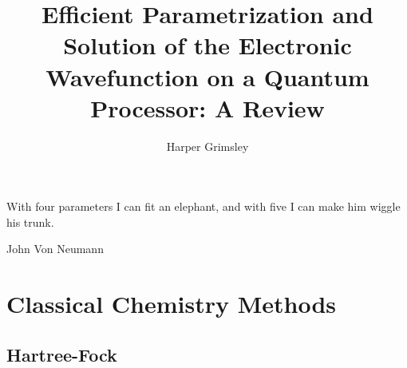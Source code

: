 \documentclass{article}
\begin{document}
\title{Efficient Parametrization and Solution of the Electronic Wavefunction on a Quantum Processor: A Review}
\author{Harper Grimsley}

\maketitle
\setlength \epigraphwidth {\linewidth}
\epigraph{\centering With four parameters I can fit an elephant, and with five I can make him wiggle his trunk.}{John Von Neumann}
\tableofcontents
\section{Classical Chemistry Methods}
\subsection{Hartree-Fock}
\end{document}
